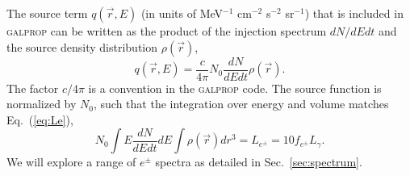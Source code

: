 \documentclass[doublespace,nopageskip]{VTthesis}
\begin{document}
The source term $q(\vec{r},E)$ (in units of  MeV$^{-1}$ cm$^{-2}$ s$^{-2}$ sr$^{-1}$) that is included in \textsc{galprop} can be written as the product of the injection spectrum $dN/dEdt$ and the source density distribution $\rho(\vec{r})$,
\begin{equation}
  q(\vec{r},E) = \frac{c}{4\pi} N_0 \dfrac{dN}{dEdt}\rho(\vec{r}).
\end{equation}
The factor $c/4\pi$ is a convention in the \textsc{galprop} code. The source function is normalized by $N_0$, such that the integration over energy and volume matches Eq.~(\ref{eq:Le}),
\begin{equation}
  \label{eq:normal}
  N_0 \int E\dfrac{dN}{dEdt}dE \int\rho(\vec{r})dr^3 = L_{e^\pm} = 10 f_{e^\pm} L_\gamma.
\end{equation}
We will explore a range of $e^\pm$ spectra as detailed in Sec.~\ref{sec:spectrum}.
\end{document}
